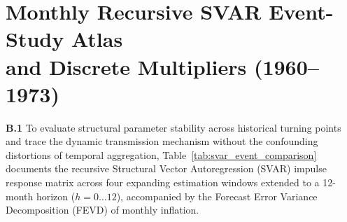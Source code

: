 \section[Monthly Recursive SVAR Event-Study Atlas (1960--1973)]{Monthly Recursive SVAR Event-Study Atlas\\and Discrete Multipliers (1960--1973)}
\label{app:annual_svar}
\label{app:recursive_svar}

\textbf{B.1} To evaluate structural parameter stability across historical turning points and trace the dynamic transmission mechanism without the confounding distortions of temporal aggregation, Table~\ref{tab:svar_event_comparison} documents the recursive Structural Vector Autoregression (SVAR) impulse response matrix across four expanding estimation windows extended to a 12-month horizon ($h = 0 \dots 12$), accompanied by the Forecast Error Variance Decomposition (FEVD) of monthly inflation.

